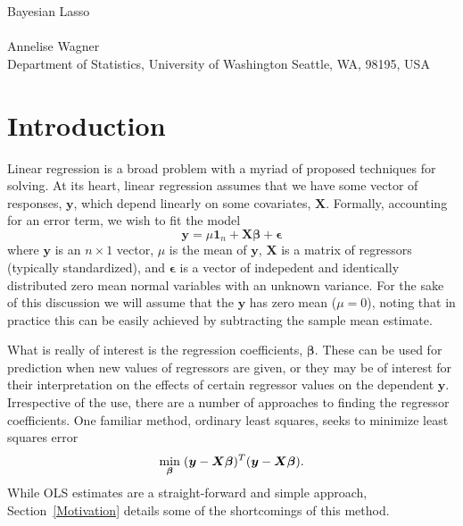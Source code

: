 \documentclass{uwstat572}
\begin{document}

\begin{center}
  {\LARGE Bayesian Lasso}\\\ \\
  {Annelise Wagner \\ 
    Department of Statistics, University of Washington Seattle, WA, 98195, USA
  }
\end{center}



\begin{abstract}
  The Bayesian Lasso, building on the interpretation of Tibshirani, places Laplace priors on linear regression coefficients to allow for Bayesian approaches to parameter and error estimation. An efficient Gibbs sampler allows for quick computation and may be exanded to other forms of penalized regression.
\end{abstract}

\section{Introduction}
Linear regression is a broad problem with a myriad of proposed techniques for solving. At its heart, linear regression assumes that we have some vector of responses, $\boldsymbol{y}$, which depend linearly on some covariates, $\boldsymbol{X}$. Formally, accounting for an error term, we wish to fit the model \[
\boldsymbol{y} = \mu \boldsymbol{1}_n + \boldsymbol{X}\boldsymbol{\beta}+\boldsymbol{\epsilon}
\] where $\boldsymbol{y}$ is an $n \times 1$ vector, $\mu$ is the mean of $\boldsymbol{y}$, $\boldsymbol{X}$ is a matrix of regressors (typically standardized), and $\boldsymbol{\epsilon}$ is a vector of indepedent and identically distributed zero mean normal variables with an unknown variance. For the sake of this discussion we will assume that the $\boldsymbol{y}$ has zero mean ($\mu=0$), noting that in practice this can be easily achieved by subtracting the sample mean estimate.

What is really of interest is the regression coefficients, $\boldsymbol{\beta}$. These can be used for prediction when new values of regressors are given, or they may be of interest for their interpretation on the effects of certain regressor values on the dependent $\boldsymbol{y}$. Irrespective of the use, there are a number of approaches to finding the regressor coefficients. One familiar method, ordinary least squares, seeks to minimize least squares error\[
\min_{\boldsymbol{\beta}} \hspace{.1cm} (\boldsymbol{y}-\boldsymbol{X}\boldsymbol{\beta})^T(\boldsymbol{y}-\boldsymbol{X}\boldsymbol{\beta}).
\] While OLS estimates are a straight-forward and simple approach, Section~\ref{Motivation} details some of the shortcomings of this method.
\end{document}
